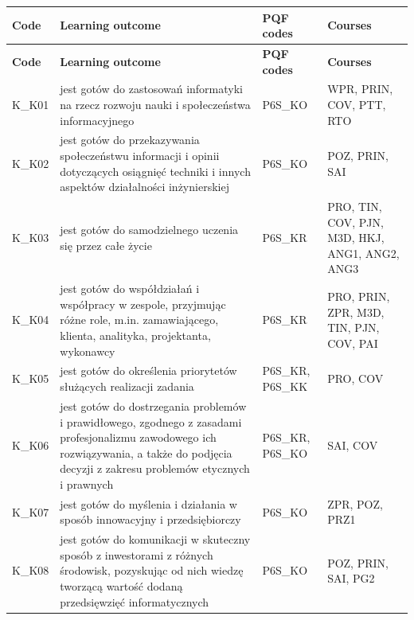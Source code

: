 \documentclass[12pt,a4paper]{article}
\newcommand{\thdrule}{\noalign{\global\setlength{\extrarowheight}{0pt}}}
\newcommand{\thdend}{\noalign{\global\setlength{\extrarowheight}{4pt}}}
\begin{document}
{\scriptsize
\begin{longtable}{m{1cm}m{8.8cm}m{2.1cm}m{2.5cm}}
\thdrule\toprule
\rowcolor{pjatkRed} {\color{white}\footnotesize\textbf{\vphantom{Ag}Code}} & {\color{white}\footnotesize\textbf{\vphantom{Ag}Learning outcome}} & {\color{white}\footnotesize\textbf{\vphantom{Ag}PQF codes}} & {\color{white}\footnotesize\textbf{\vphantom{Ag}Courses}} \\
\midrule\thdend
\endfirsthead
\thdrule\toprule
\rowcolor{pjatkRed} {\color{white}\footnotesize\textbf{\vphantom{Ag}Code}} & {\color{white}\footnotesize\textbf{\vphantom{Ag}Learning outcome}} & {\color{white}\footnotesize\textbf{\vphantom{Ag}PQF codes}} & {\color{white}\footnotesize\textbf{\vphantom{Ag}Courses}} \\
\midrule\thdend
\endhead
\rowcolor{tableRowLight} K\_K01 & jest gotów do zastosowań informatyki na rzecz rozwoju nauki i społeczeństwa informacyjnego & {\scriptsize P6S\_KO} & {\scriptsize WPR, PRIN, COV, PTT, RTO} \\
\rowcolor{tableRowAlt} K\_K02 & jest gotów do przekazywania społeczeństwu informacji i opinii dotyczących osiągnięć techniki i innych aspektów działalności inżynierskiej & {\scriptsize P6S\_KO} & {\scriptsize POZ, PRIN, SAI} \\
\rowcolor{tableRowLight} K\_K03 & jest gotów do samodzielnego uczenia się przez całe życie & {\scriptsize P6S\_KR} & {\scriptsize PRO, TIN, COV, PJN, M3D, HKJ, ANG1, ANG2, ANG3} \\
\rowcolor{tableRowAlt} K\_K04 & jest gotów do współdziałań i współpracy w zespole, przyjmując różne role, m.in. zamawiającego, klienta, analityka, projektanta, wykonawcy & {\scriptsize P6S\_KR} & {\scriptsize PRO, PRIN, ZPR, M3D, TIN, PJN, COV, PAI} \\
\rowcolor{tableRowLight} K\_K05 & jest gotów do określenia priorytetów służących realizacji zadania & {\scriptsize P6S\_KR, P6S\_KK} & {\scriptsize PRO, COV} \\
\rowcolor{tableRowAlt} K\_K06 & jest gotów do dostrzegania problemów i prawidłowego, zgodnego z zasadami profesjonalizmu zawodowego ich rozwiązywania, a także do podjęcia decyzji z zakresu problemów etycznych i prawnych & {\scriptsize P6S\_KR, P6S\_KO} & {\scriptsize SAI, COV} \\
\rowcolor{tableRowLight} K\_K07 & jest gotów do myślenia i działania w sposób innowacyjny i przedsiębiorczy & {\scriptsize P6S\_KO} & {\scriptsize ZPR, POZ, PRZ1} \\
\rowcolor{tableRowAlt} K\_K08 & jest gotów do komunikacji w skuteczny sposób z inwestorami z różnych środowisk, pozyskując od nich wiedzę tworzącą wartość dodaną przedsięwzięć informatycznych & {\scriptsize P6S\_KO} & {\scriptsize POZ, PRIN, SAI, PG2} \\
\bottomrule
\end{longtable}}
\end{document}
